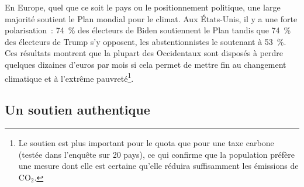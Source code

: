 \documentclass[a5paper,french,openany]{memoir}
\begin{document}
En Europe, quel que ce soit le pays ou le positionnement politique, une large majorité soutient le Plan mondial pour le climat. 
Aux États-Unis, il y a une forte polarisation~: 74~\% des électeurs de Biden soutiennent le Plan tandis que 74~\% des électeurs de Trump s'y opposent, les abstentionnistes le soutenant à 53~\%.  
Ces résultats montrent que la plupart des Occidentaux sont disposés à perdre quelques dizaines d'euros par mois si cela permet de mettre fin au changement climatique et à l'extrême pauvreté\footnote{Le soutien est plus important pour le quota que pour une taxe carbone (testée dans l'enquête sur 20 pays), ce qui confirme que la population préfère une mesure dont elle est certaine qu'elle réduira suffisamment les émissions de CO$_\text{2}$.}. 

\subsection{Un soutien authentique} %
\end{document}
